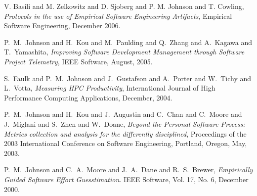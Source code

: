 \documentclass[11pt]{article}
\begin{document}
\begin{Publications: Closely Related}

\item V. Basili and M. Zelkowitz and D. Sjoberg and P. M. Johnson and T. Cowling, 
{\em Protocols in the use of Empirical Software Engineering Artifacts}, 
Empirical Software Engineering, December 2006.

\item P.~M.~Johnson and H.~Kou and M.~Paulding and Q.~Zhang and A.~Kagawa
and T.~Yamashita, {\em Improving Software Development Management through
Software Project Telemetry}, IEEE Software, August, 2005.

\item S.~Faulk and P.~M.~Johnson and J.~Gustafson and A.~Porter and W.~Tichy
and L.~Votta, {\em Measuring HPC Productivity}, International Journal of
High Performance Computing Applications, December, 2004.

\item P.~M.~Johnson and H.~Kou and J.~Augustin and C.~Chan and C.~Moore and
J.~Miglani and S.~Zhen and W.~Doane, {\em Beyond the Personal Software
Process: Metrics collection and analysis for the differently disciplined},
Proceedings of the 2003 International Conference on Software Engineering,
Portland, Oregon, May, 2003.
  
\item P.~M.~Johnson and C.~A.~Moore and J.~A.~Dane and R.~S.~Brewer, {\em
Empirically Guided Software Effort Guesstimation}.  IEEE Software, Vol.
17, No. 6, December 2000.
  
\end{Publications: Closely Related}
\end{document}
